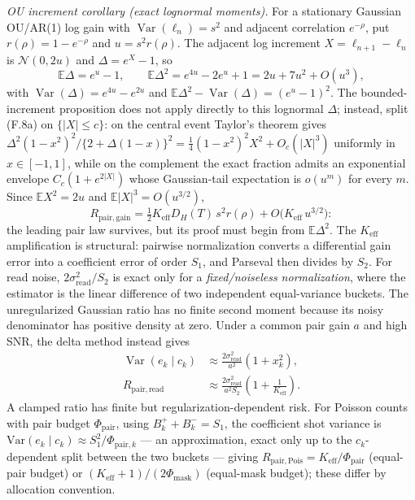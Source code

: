\emph{OU increment corollary (exact lognormal moments).} For a stationary Gaussian OU/AR(1) log gain with $\operatorname{Var}(\ell_n)=s^2$ and adjacent correlation $e^{-\rho}$, put $r(\rho)=1-e^{-\rho}$ and $u=s^2r(\rho)$. The adjacent log increment $X=\ell_{n+1}-\ell_n$ is $\mathcal N(0,2u)$ and $\Delta=e^X-1$, so
\begin{equation}
\mathbb{E}\Delta=e^{u}-1,\qquad
\mathbb{E}\Delta^2=e^{4u}-2e^{u}+1=2u+7u^2+O(u^3),
\tag{F.8c}
\end{equation}
with $\operatorname{Var}(\Delta)=e^{4u}-e^{2u}$ and $\mathbb{E}\Delta^2-\operatorname{Var}(\Delta)=(e^{u}-1)^2$. The bounded-increment proposition does not apply directly to this lognormal $\Delta$; instead, split (F.8a) on $\{|X|\le c\}$: on the central event Taylor's theorem gives $\Delta^2(1-x^2)^2/\{2+\Delta(1-x)\}^2=\tfrac14(1-x^2)^2X^2+O_c(|X|^3)$ uniformly in $x\in[-1,1]$, while on the complement the exact fraction admits an exponential envelope $C_c(1+e^{2|X|})$ whose Gaussian-tail expectation is $o(u^m)$ for every $m$. Since $\mathbb{E}X^2=2u$ and $\mathbb{E}|X|^3=O(u^{3/2})$,
\begin{equation}
R_{\mathrm{pair,gain}}
=\tfrac12K_{\mathrm{eff}}D_H(T)\,s^2r(\rho)
+O\!\big(K_{\mathrm{eff}}\,u^{3/2}\big):
\tag{F.8d}
\end{equation}
the leading pair law survives, but its proof must begin from $\mathbb{E}\Delta^2$. The $K_{\mathrm{eff}}$ amplification is structural: pairwise normalization converts a differential gain error into a coefficient error of order $S_1$, and Parseval then divides by $S_2$. For read noise, $2\sigma_{\mathrm{read}}^2/S_2$ is exact only for a \emph{fixed/noiseless normalization}, where the estimator is the linear difference of two independent equal-variance buckets. The unregularized Gaussian ratio has no finite second moment because its noisy denominator has positive density at zero. Under a common pair gain $a$ and high SNR, the delta method instead gives
\[
\begin{aligned}
\operatorname{Var}(e_k\mid c_k)
&\approx\frac{2\sigma_{\mathrm{read}}^2}{a^2}(1+x_k^2),\\
R_{\mathrm{pair,read}}
&\approx\frac{2\sigma_{\mathrm{read}}^2}{a^2S_2}
\left(1+\frac1{K_{\mathrm{eff}}}\right).
\end{aligned}
\]
A clamped ratio has finite but regularization-dependent risk. For Poisson counts with pair budget $\Phi_{\mathrm{pair}}$, using $B_k^++B_k^-=S_1$, the coefficient shot variance is $\mathrm{Var}(e_k\mid c_k)\approx S_1^2/\Phi_{\mathrm{pair},k}$ --- an approximation, exact only up to the $c_k$-dependent split between the two buckets --- giving $R_{\mathrm{pair,Pois}}=K_{\mathrm{eff}}/\Phi_{\mathrm{pair}}$ (equal-pair budget) or $(K_{\mathrm{eff}}+1)/(2\Phi_{\mathrm{mask}})$ (equal-mask budget); these differ by allocation convention.

